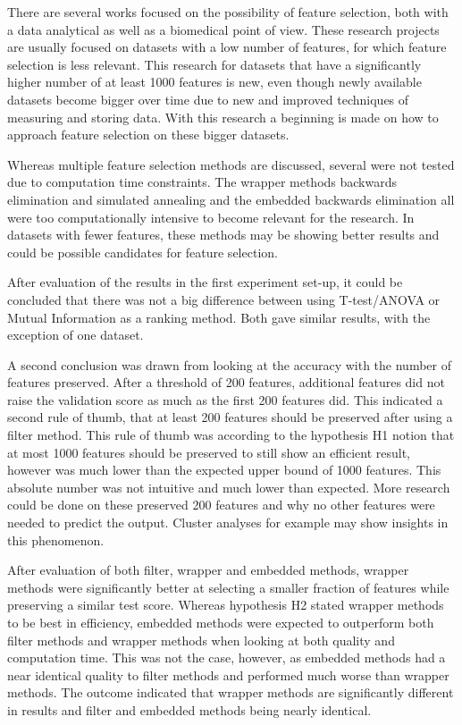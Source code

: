 \documentclass[10pt,a4paper]{report}
\begin{document}
	There are several works focused on the possibility of feature selection, both with a data analytical \cite{catal2009investigating} as well as a biomedical \cite{baumgartner2006data, welthagen2005comprehensive, liu2002comparative} point of view. These research projects are usually focused on datasets with a low number of features, for which feature selection is less relevant. This research for datasets that have a significantly higher number of at least 1000 features is new, even though newly available datasets become bigger over time due to new and improved techniques of measuring and storing data. With this research a beginning is made on how to approach feature selection on these bigger datasets.
	
	Whereas multiple feature selection methods are discussed, several were not tested due to computation time constraints. The wrapper methods backwards elimination and simulated annealing and the embedded backwards elimination all were too computationally intensive to become relevant for the research. In datasets with fewer features, these methods may be showing better results and could be possible candidates for feature selection.
	
	After evaluation of the results in the first experiment set-up, it could be concluded that there was not a big difference between using T-test/ANOVA or Mutual Information as a ranking method. Both gave similar results, with the exception of one dataset. 
	
	A second conclusion was drawn from looking at the accuracy with the number of features preserved. After a threshold of 200 features, additional features did not raise the validation score as much as the first 200 features did. This indicated a second rule of thumb, that at least 200 features should be preserved after using a filter method. This rule of thumb was according to the hypothesis H1 notion that at most 1000 features should be preserved to still show an efficient result, however was much lower than the expected upper bound of 1000 features. This absolute number was not intuitive and much lower than expected. More research could be done on these preserved 200 features and why no other features were needed to predict the output. Cluster analyses for example may show insights in this phenomenon.
	
	After evaluation of both filter, wrapper and embedded methods, wrapper methods were significantly better at selecting a smaller fraction of features while preserving a similar test score.  Whereas hypothesis H2 stated wrapper methods to be best in efficiency, embedded methods were expected to outperform both filter methods and wrapper methods when looking at both quality and computation time. This was not the case, however, as embedded methods had a near identical quality to filter methods and performed much worse than wrapper methods. The outcome indicated that wrapper methods are significantly different in results and filter and embedded methods being nearly identical.
	
\end{document}
